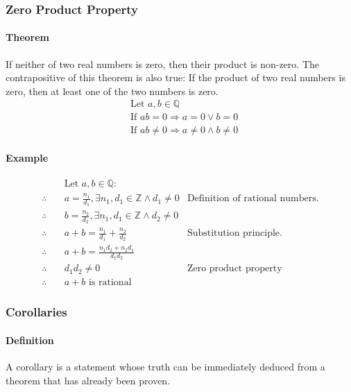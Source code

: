 \subsubsection{Zero Product Property}
\paragraph*{Theorem}
If neither of two real numbers is zero, then their product is non-zero. The contrapositive of this theorem is also true: If the product of two real numbers is zero, then at least one of the two numbers is zero.
\begin{align*}
    &\text{Let } a,b \in \mathbb{Q}\\
    &\text{If } ab = 0 \Rightarrow a = 0 \lor b = 0\\
    &\text{If } ab \neq 0 \Rightarrow a \neq 0 \land b \neq 0
\end{align*}

\paragraph*{Example}
\begin{align*}
    &\text{Let } a,b \in \mathbb{Q}:\\
    \therefore \quad & a = \frac{n_1}{d_1}, \exists n_1,d_1 \in \mathbb{Z} \land d_1 \neq 0 & \text{Definition of rational numbers.}\\
    \therefore \quad & b = \frac{n_2}{d_2}, \exists n_1,d_1 \in \mathbb{Z} \land d_2 \neq 0\\
    \therefore \quad & a + b = \frac{n_1}{d_1} + \frac{n_2}{d_2} & \text{Substitution principle.}\\
    \therefore \quad & a + b = \frac{n_1d_2 + n_2d_1}{d_1d_2}\\
    \therefore \quad & d_1d_2 \neq 0 & \text{Zero product property}\\
    \therefore \quad & a + b \text{ is rational}
\end{align*}

\subsubsection*{Corollaries}
\paragraph*{Definition}
A corollary is a statement whose truth can be immediately deduced from a theorem that has already been proven.

